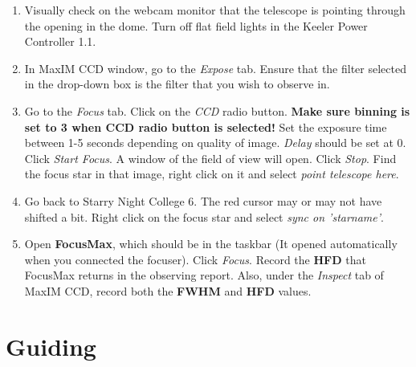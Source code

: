 \documentclass[11pt]{report}
\begin{document}
\begin{enumerate}
\item Visually check on the webcam monitor that the telescope is pointing through the opening in the dome. Turn off flat field lights in the Keeler Power Controller 1.1.
\item In MaxIM CCD window, go to the \emph{Expose} tab. Ensure that the filter selected in the drop-down box is the filter that you wish to observe in.
\item Go to the \emph{Focus} tab. Click on the \emph{CCD} radio button. {\bf Make sure binning is set to 3 when CCD radio button is selected!} Set the exposure time between 1-5 seconds depending on quality of image. \emph{Delay} should be set at 0. Click \emph{Start Focus}. A window of the field of view will open. Click \emph{Stop}. Find the focus star in that image, right click on it and select \emph{point telescope here}.
\item Go back to Starry Night College 6.  The red cursor may or may not have shifted a bit. Right click on the focus star and select \emph{sync on 'starname'}. 
\item Open {\bf FocusMax}, which should be in the taskbar (It opened automatically when you connected the focuser). Click \emph{Focus}. Record the {\bf HFD} that FocusMax returns in the observing report. Also, under the \emph{Inspect} tab of MaxIM CCD, record both the {\bf FWHM} and {\bf HFD} values. 
\end{enumerate}

\section{Guiding}
\end{document}
